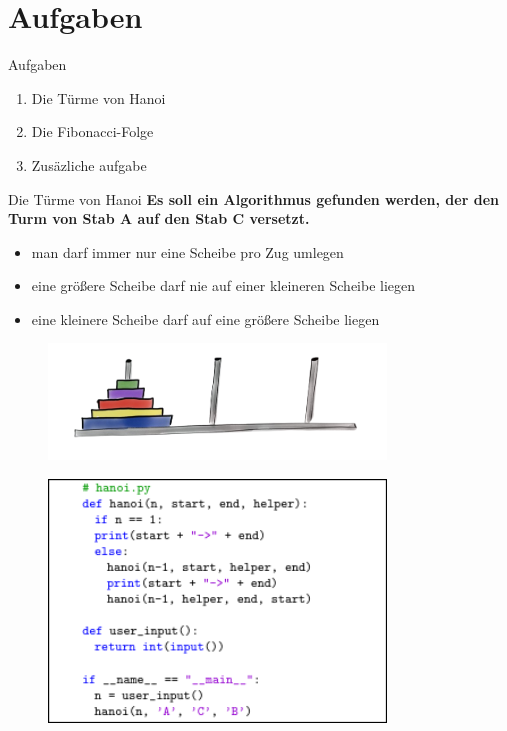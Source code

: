 \documentclass{beamer}
\begin{document}
\section{Aufgaben}
\begin{frame}{Aufgaben}
\begin{enumerate}
  \item Die Türme von Hanoi
  \item Die Fibonacci-Folge 
  \item Zusäzliche aufgabe%
\end{enumerate}
\end{frame}
\begin{frame}{Die Türme von Hanoi}
\textbf{\tiny  
    Es soll ein Algorithmus gefunden
    werden, der den Turm von Stab A auf den Stab C versetzt.
} 
\vspace{10pt}
\begin{itemize}
    \tiny
    \item{man darf immer nur eine Scheibe pro Zug umlegen}
    \item{eine größere Scheibe darf nie auf einer kleineren Scheibe liegen}
    \item{eine kleinere Scheibe darf auf eine größere Scheibe  liegen}
\end{itemize}
\begin{figure}
    \centering
    \includegraphics[width=0.8\textwidth]{bilder/somefoo.png}
\end{figure}
	
\end{frame}

\begin{frame}
\begin{figure}
    \centering
    \includegraphics[width=0.8\textwidth]{code/hanoi_code.png}
\end{figure}
\end{frame}
\end{document}
